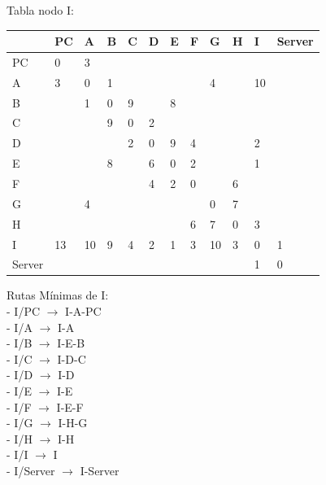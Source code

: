 \documentclass[a4paper]{article}
\begin{document}
\begin{table}[ht]
Tabla nodo I:\\
\begin{tabular}{|l|l|l|l|l|l|l|l|l|l|l|l|}
\hline
       & PC & A  & B & C & D & E & F & G  & H & I  & Server \\ \hline
PC     & 0  & 3  &   &   &   &   &   &    &   &    &        \\ \hline
A      & 3  & 0  & 1 &   &   &   &   & 4  &   & 10 &        \\ \hline
B      &    & 1  & 0 & 9 &   & 8 &   &    &   &    &        \\ \hline
C      &    &    & 9 & 0 & 2 &   &   &    &   &    &        \\ \hline
D      &    &    &   & 2 & 0 & 9 & 4 &    &   & 2  &        \\ \hline
E      &    &    & 8 &   & 6 & 0 & 2 &    &   & 1  &        \\ \hline
F      &    &    &   &   & 4 & 2 & 0 &    & 6 &    &        \\ \hline
G      &    & 4  &   &   &   &   &   & 0  & 7 &    &        \\ \hline
H      &    &    &   &   &   &   & 6 & 7  & 0 & 3  &        \\ \hline
I      & 13 & 10 & 9 & 4 & 2 & 1 & 3 & 10 & 3 & 0  & 1      \\ \hline
Server &    &    &   &   &   &   &   &    &   & 1  & 0      \\ \hline
\end{tabular}

Rutas Mínimas de I:\\
-	I/PC  $\rightarrow$  I-A-PC\\
-	I/A  $\rightarrow$  I-A\\
-	I/B  $\rightarrow$  I-E-B\\
-	I/C  $\rightarrow$ I-D-C\\
-	I/D  $\rightarrow$  I-D\\
-	I/E  $\rightarrow$  I-E\\
-	I/F  $\rightarrow$  I-E-F\\
-	I/G  $\rightarrow$  I-H-G\\
-	I/H  $\rightarrow$  I-H\\
-	I/I  $\rightarrow$  I\\
-	I/Server  $\rightarrow$  I-Server\\
\end{table}

\clearpage
\end{document}
